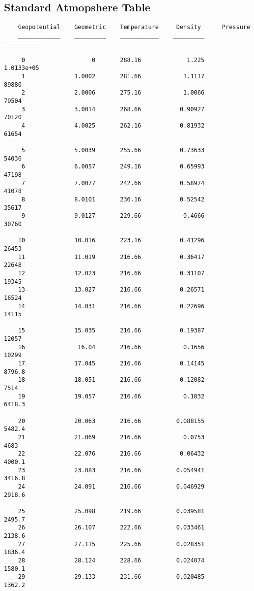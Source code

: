 \documentclass{article}
\begin{document}
\subsection{Standard Atmopshere Table}
        \color{black} \begin{verbatim}
    Geopotential    Geometric    Temperature     Density      Pressure 
    ____________    _________    ___________    _________    __________

     0                   0       288.16             1.225    1.0133e+05
     1              1.0002       281.66            1.1117         89880
     2              2.0006       275.16            1.0066         79504
     3              3.0014       268.66           0.90927         70120
     4              4.0025       262.16           0.81932         61654
     
     5              5.0039       255.66           0.73633         54036
     6              6.0057       249.16           0.65993         47198
     7              7.0077       242.66           0.58974         41078
     8              8.0101       236.16           0.52542         35617
     9              9.0127       229.66            0.4666         30760
    
    10              10.016       223.16           0.41296         26453
    11              11.019       216.66           0.36417         22648
    12              12.023       216.66           0.31107         19345
    13              13.027       216.66           0.26571         16524
    14              14.031       216.66           0.22696         14115
    
    15              15.035       216.66           0.19387         12057
    16               16.04       216.66            0.1656         10299
    17              17.045       216.66           0.14145        8796.8
    18              18.051       216.66           0.12082          7514
    19              19.057       216.66            0.1032        6418.3
    
    20              20.063       216.66          0.088155        5482.4
    21              21.069       216.66            0.0753          4683
    22              22.076       216.66           0.06432        4000.1
    23              23.083       216.66          0.054941        3416.8
    24              24.091       216.66          0.046929        2918.6
    
    25              25.098       219.66          0.039581        2495.7
    26              26.107       222.66          0.033461        2138.6
    27              27.115       225.66          0.028351        1836.4
    28              28.124       228.66          0.024074        1580.1
    29              29.133       231.66          0.020485        1362.2
    

\end{verbatim}
\end{document}
